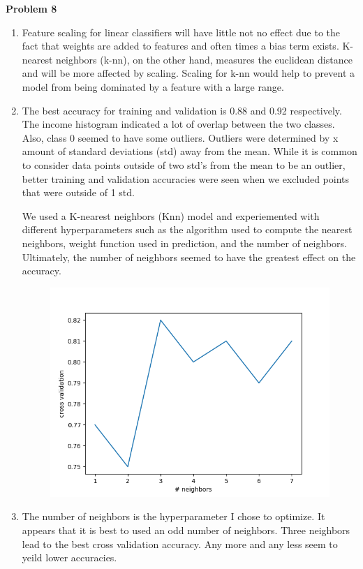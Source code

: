 \documentclass[11pt,letterpaper]{article}
\begin{document}
\textbf{Problem 8}
\begin{enumerate}[labelindent=0pt]
\item 
Feature scaling for linear classifiers will have little not no effect due to the
fact that weights are added to features and often times a bias term exists.
K-nearest neighbors (k-nn), on the other hand, measures the euclidean distance and will
be more affected by scaling. Scaling for k-nn would help to prevent a model from
being dominated by a feature with a large range. 
\item
The best accuracy for training and validation is 0.88 and 0.92 respectively.  The
income histogram indicated a lot of overlap between the two classes.  Also,
class 0 seemed to have some outliers.  Outliers were determined by x amount of
standard deviations (std) away from the mean.  While it is common to consider
data points outside of two std's from the mean to be an outlier, better training
and validation accuracies were seen when we excluded points that were outside of
1 std.

We used a K-nearest neighbors (Knn) model and experiemented with different
hyperparameters such as the algorithm used to compute the nearest neighbors,
weight function used in prediction, and the number of neighbors.  Ultimately,
the number of neighbors seemed to have the greatest effect on the accuracy.
\begin{figure}[h!]
        \centering
        \includegraphics[width=.3\textwidth]{cv_plot.png}
        \label{fig:crossover}
\end{figure}
\item
The number of neighbors is the hyperparameter I chose to optimize.  It appears
that it is best to used an odd number of neighbors.  Three neighbors lead to the
best cross validation accuracy.  Any more and any less seem to yeild lower
accuracies.  


\end{enumerate}

\noindent
\end{document}
